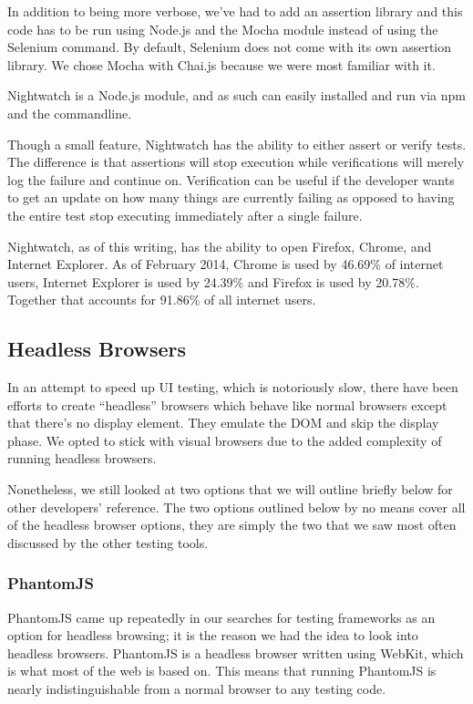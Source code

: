 \documentclass[12pt]{ucthesis}
\begin{document}
In addition to being more verbose, we've had to add an assertion library and this code has to be run using Node.js and the Mocha module instead of using the Selenium command. By default, Selenium does not come with its own assertion library. We chose Mocha with Chai.js because we were most familiar with it.

Nightwatch is a Node.js module, and as such can easily installed and run via npm and the commandline.

Though a small feature, Nightwatch has the ability to either assert or verify tests. The difference is that assertions will stop execution while verifications will merely log the failure and continue on. Verification can be useful if the developer wants to get an update on how many things are currently failing as opposed to having the entire test stop executing immediately after a single failure.

Nightwatch, as of this writing, has the ability to open Firefox, Chrome, and Internet Explorer. As of February 2014, Chrome is used by 46.69\% of internet users, Internet Explorer is used by 24.39\% and Firefox is used by 20.78\%\cite{BrowserStats}. Together that accounts for 91.86\% of all internet users.

\subsection{Headless Browsers}
In an attempt to speed up UI testing, which is notoriously slow, there have been efforts to create ``headless'' browsers which behave like normal browsers except that there's no display element. They emulate the DOM and skip the display phase. We opted to stick with visual browsers due to the added complexity of running headless browsers.

Nonetheless, we still looked at two options that we will outline briefly below for other developers' reference. The two options outlined below by no means cover all of the headless browser options, they are simply the two that we saw most often discussed by the other testing tools.

\subsubsection{PhantomJS}
PhantomJS\cite{PhantomJS} came up repeatedly in our searches for testing frameworks as an option for headless browsing; it is the reason we had the idea to look into headless browsers. PhantomJS is a headless browser written using WebKit, which is what most of the web is based on. This means that running PhantomJS is nearly indistinguishable from a normal browser to any testing code.
\end{document}
